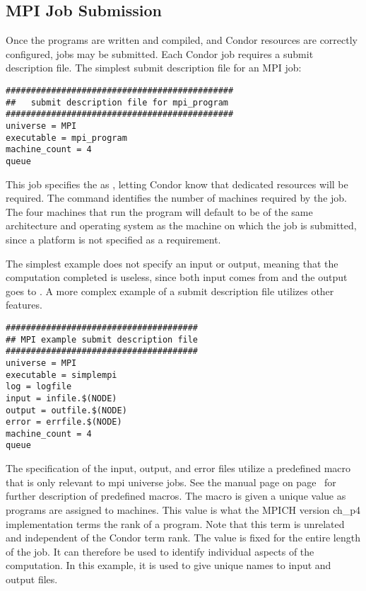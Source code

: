 \subsection{\label{sec:MPI-submit}MPI Job Submission}

Once the programs are written and compiled, and Condor resources
are correctly configured, jobs may be submitted.
Each Condor job requires a submit description file.
The simplest submit description file for an MPI job:

\begin{verbatim}
#############################################
##   submit description file for mpi_program
#############################################
universe = MPI
executable = mpi_program
machine_count = 4
queue 
\end{verbatim}

This job specifies the  as ,
letting Condor know that dedicated resources will be required.
The  command identifies the number
of machines required by the job.
The four machines that run the program will default to
be of the same architecture
and operating system as the machine on which the job is submitted,
since a platform is not specified as a requirement.

The simplest example does not specify an input or output,
meaning that the computation completed is useless,
since both input comes from and the output goes to .
A more complex example of a submit description file
utilizes other features.
\begin{verbatim}
######################################
## MPI example submit description file
######################################
universe = MPI
executable = simplempi
log = logfile
input = infile.$(NODE)
output = outfile.$(NODE)
error = errfile.$(NODE)
machine_count = 4
queue
\end{verbatim}

The specification of the input, output, and error files
utilize a predefined macro that is only relevant to
mpi universe jobs.
See the  manual page on
page~\pageref{man-condor-submit} 
for further description of predefined macros.
The  macro is given a unique value as
programs are assigned to machines.
This value is what the MPICH version ch\_p4 implementation
terms the rank of a program.
Note that this term is unrelated and independent of the
Condor term rank.
The  value is fixed for the entire length
of the job.
It can therefore be used to identify individual aspects
of the computation.
In this example, it is used to give unique names to input
and output files.

